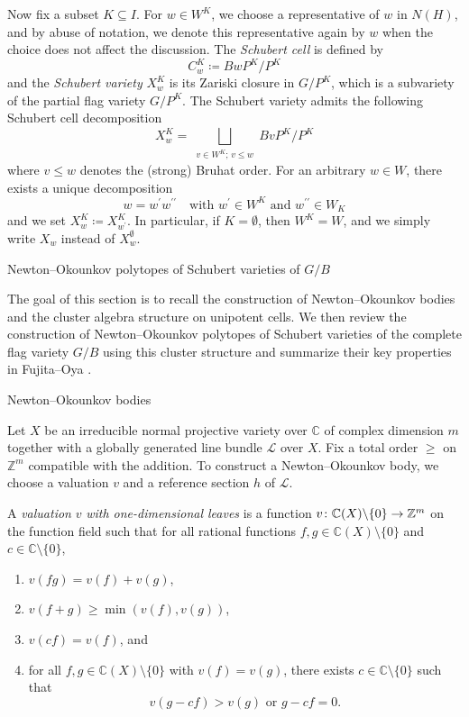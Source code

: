 \documentclass[11pt]{amsart}
\makeatletter
\def\section{\@startsection{section}{1}%
  \z@{-1.2\linespacing\@plus-.5\linespacing}{.8\linespacing}%
  {\normalfont\bfseries\large}}
\def\subsection{\@startsection{subsection}{2}%
  \z@{-.8\linespacing\@plus-.3\linespacing}{.3\linespacing\@plus.2\linespacing}%
  {\normalfont\bfseries}}
\newcommand{\C}{\mathbb{C}}
\newcommand{\Z}{\mathbb{Z}}
\numberwithin{equation}{section}
\theoremstyle{plain}
\theoremstyle{definition}
\def\to{\mathchoice{\longrightarrow}{\rightarrow}{\rightarrow}{\rightarrow}}
\numberwithin{equation}{section}
\makeatother
\begin{document}
Now fix a subset $K \subseteq I$. For $w \in W^K$, we choose a representative of $w$ in $N(H)$, and by abuse of notation, we denote this representative again by $w$ when the choice does not affect the discussion. The \emph{Schubert cell} is defined by
$$
C^K_w \coloneqq B{w}P^K/P^K
$$ 
and the \emph{Schubert variety} $X^K_{w}$ is its Zariski closure in $G/P^K$, which is a subvariety of the partial flag variety $G/P^K$. The Schubert variety admits the following Schubert cell decomposition
\begin{equation}\label{equ_decompositionofSchu}
X^K_w = \bigsqcup_{\substack{v \in W^K; \, v \leq w}} B v P^K / P^K
\end{equation}
where $v \leq w$ denotes the (strong) Bruhat order. For an arbitrary $w \in W$, there exists a unique decomposition 
$$
w = w^\prime w^{\prime \prime} \quad \mbox{with $w^\prime \in W^K$ and $w^{\prime \prime} \in W_K$}
$$ and we set $X^K_{w} \coloneqq X^K_{w^\prime}$. In particular, if $K = \emptyset$, then $W^K = W$, and we simply write $X_w$ instead of $X_w^\emptyset$.



\section{Newton--Okounkov polytopes of Schubert varieties of $G/B$}\label{Sec_NOp}

The goal of this section is to recall the construction of Newton--Okounkov bodies and the cluster algebra structure on unipotent cells. We then review the construction of Newton--Okounkov polytopes of Schubert varieties of the complete flag variety $G/B$ using this cluster structure and summarize their key properties in Fujita--Oya \cite{FO25}.



\subsection{Newton--Okounkov bodies}\label{sec_NObodiesreview}

Let $X$ be an irreducible normal projective variety over $\C$ of complex dimension $m$ together with a globally generated line bundle $\mathcal{L}$ over $X$. Fix a total order $\geq$ on $\Z^m$ compatible with the addition. To construct a Newton--Okounkov body, we choose a valuation $v$ and a reference section $h$ of $\mathcal{L}$. 

A \emph{valuation} $v$ \emph{with one-dimensional leaves} is a function $v \colon \C(X) \backslash \{0\} \to \Z^m$ on the function field such that for all rational functions $f, g \in \C(X) \setminus \{0\}$ and $c \in \C \setminus \{0\}$,
\begin{enumerate}
\item $v(fg) = v(f) + v(g)$,
\item $v(f+g) \geq \min (v(f), v(g))$,
\item $v(cf) = v(f)$, and
\item for all $f, g \in \C(X) \setminus \{0\} $ with $v(f) = v(g)$, there exists $c \in \C \setminus \{0\}$ such that $$
v(g - cf) > v(g) \mbox{ or } g - cf = 0.
$$ 
\end{enumerate}
\end{document}
